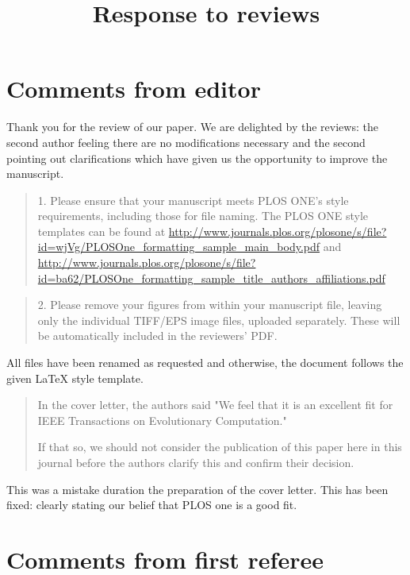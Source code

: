 \documentclass[a4]{article}
\title{Response to reviews}
\begin{document}
\maketitle

\section{Comments from editor}

Thank you for the review of our paper. We are delighted by the reviews: the
second author feeling there are no modifications necessary and the second
pointing out clarifications which have given us the opportunity to improve the
manuscript.

\begin{quote}
	1. Please ensure that your manuscript meets PLOS ONE's style requirements,
	including those for file naming. The PLOS ONE style templates can be found at
	\url{http://www.journals.plos.org/plosone/s/file?id=wjVg/PLOSOne_formatting_sample_main_body.pdf}
	and
	\url{http://www.journals.plos.org/plosone/s/file?id=ba62/PLOSOne_formatting_sample_title_authors_affiliations.pdf}
\end{quote}

\begin{quote}
    2. Please remove your figures from within your manuscript file, leaving only
    the individual TIFF/EPS image files, uploaded separately.  These will be
    automatically included in the reviewers’ PDF.
\end{quote}

All files have been renamed as requested and otherwise, the document follows the
given LaTeX style template.

\begin{quote}
In the cover letter, the authors said "We feel that it is an excellent fit for IEEE Transactions on Evolutionary Computation."

If that so, we should not consider the publication of this paper here in this journal before the authors clarify this and confirm their decision.
\end{quote}

This was a mistake duration the preparation of the cover letter. This has been
fixed: clearly stating our belief that PLOS one is a good fit.

\section{Comments from first referee}
\end{document}
